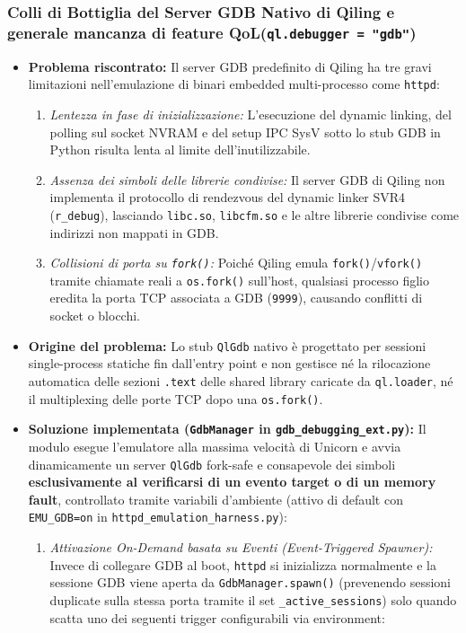 \documentclass[11pt,a4paper]{article}
\begin{document}
\subsubsection{Colli di Bottiglia del Server GDB Nativo di Qiling  e generale mancanza di feature QoL(\texttt{ql.debugger = "gdb"})}
\begin{itemize}
    \item \textbf{Problema riscontrato:} Il server GDB predefinito di Qiling ha tre gravi limitazioni nell'emulazione di binari embedded multi-processo come \texttt{httpd}:
    \begin{enumerate}
        \item \textit{Lentezza in fase di inizializzazione:} L'esecuzione del dynamic linking, del polling sul socket NVRAM e del setup IPC SysV sotto lo stub GDB in Python risulta lenta al limite dell'inutilizzabile.
        \item \textit{Assenza dei simboli delle librerie condivise:} Il server GDB di Qiling non implementa il protocollo di rendezvous del dynamic linker SVR4 (\texttt{r\_debug}), lasciando \texttt{libc.so}, \texttt{libcfm.so} e le altre librerie condivise come indirizzi non mappati in GDB.
        \item \textit{Collisioni di porta su \texttt{fork()}:} Poiché Qiling emula \texttt{fork()}/\texttt{vfork()} tramite chiamate reali a \texttt{os.fork()} sull'host, qualsiasi processo figlio eredita la porta TCP associata a GDB (\texttt{9999}), causando conflitti di socket o blocchi.
    \end{enumerate}
    \item \textbf{Origine del problema:} Lo stub \texttt{QlGdb} nativo è progettato per sessioni single-process statiche fin dall'entry point e non gestisce né la rilocazione automatica delle sezioni \texttt{.text} delle shared library caricate da \texttt{ql.loader}, né il multiplexing delle porte TCP dopo una \texttt{os.fork()}.
    \item \textbf{Soluzione implementata (\texttt{GdbManager} in \texttt{gdb\_debugging\_ext.py}):} Il modulo esegue l'emulatore alla massima velocità di Unicorn e avvia dinamicamente un server \texttt{QlGdb} fork-safe e consapevole dei simboli \textbf{esclusivamente al verificarsi di un evento target o di un memory fault}, controllato tramite variabili d'ambiente (attivo di default con \texttt{EMU\_GDB=on} in \texttt{httpd\_emulation\_harness.py}):
    \begin{enumerate}
        \item \textit{Attivazione On-Demand basata su Eventi (Event-Triggered Spawner):} Invece di collegare GDB al boot, \texttt{httpd} si inizializza normalmente e la sessione GDB viene aperta da \texttt{GdbManager.spawn()} (prevenendo sessioni duplicate sulla stessa porta tramite il set \texttt{\_active\_sessions}) solo quando scatta uno dei seguenti trigger configurabili via environment:

\end{enumerate}
\end{itemize}
\end{document}
